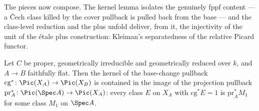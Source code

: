 The pieces now compose.  The kernel lemma isolates the genuinely fppf content — a \v Cech class
killed by the cover pullback is pulled back from the base — and the class-level reduction and the
plus unfold deliver, from it, the injectivity of the unit of the \'etale plus construction:
Kleiman's separatedness of the relative Picard functor.

\begin{theorem}
  \label{thm:exists_cechPic_map_snd_of_ker_whiskerLeft}
  \leanok
  Let \(C\) be proper, geometrically irreducible and geometrically reduced over \(k\), and \(A
  \to B\) faithfully flat.  Then the kernel of the base-change pullback \(\mathrm{cg}^{*} \colon
  \Pic(X_A) \to \Pic(X_B)\) is contained in the image of the projection pullback
  \(\mathrm{pr}_A^{*} \colon \Pic(\Spec A) \to \Pic(X_A)\): every class \(E\) on \(X_A\) with
  \(\mathrm{cg}^{*} E = 1\) is \(\mathrm{pr}_A^{*} M_1\) for some class \(M_1\) on \(\Spec A\).
\end{theorem}
